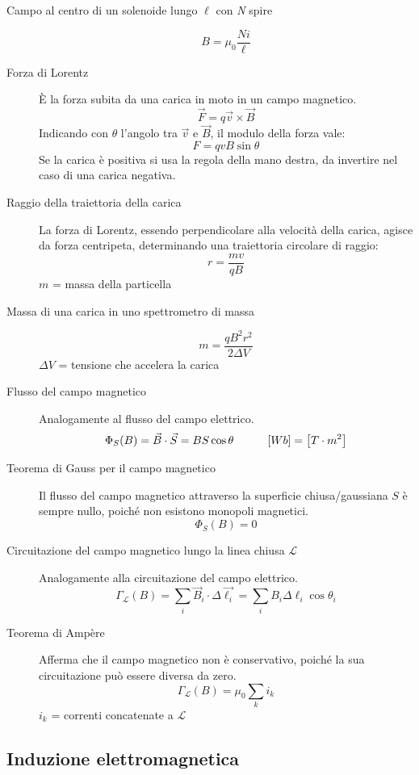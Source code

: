 \documentclass[a4paper,11pt,italian]{article}
\begin{document}
\begin{description}
  \item[Campo al centro di un solenoide lungo $ \ell $ con \textit{N} spire]
  \[ B = \mu_0 \frac{Ni}{\ell}\]
  
  \item[Forza di Lorentz] 
  È la forza subita da una carica in moto in un campo magnetico.
  \[ \vec{F} = q \vec{v} \times \vec{B} \]
  Indicando con $ \theta $ l'angolo tra $ \vec{v} $ e $ \vec{B} $, il modulo della forza vale:
  \[ F = qvB\sin \theta \]
  Se la carica è positiva si usa la regola della mano destra, da invertire nel caso di una carica negativa.
  
  \item[Raggio della traiettoria della carica] 
  La forza di Lorentz, essendo perpendicolare alla velocità della carica, agisce da forza centripeta, determinando una traiettoria circolare di raggio:
  \[ r = \frac{mv}{qB} \]
  $ m $ = massa della particella

  \item[Massa di una carica in uno spettrometro di massa]
  \[ m = \frac{qB^2r^2}{2 \Delta V} \]
  $  \Delta V $ = tensione che accelera la carica
  
  \item[Flusso del campo magnetico] 
  Analogamente al flusso del campo elettrico.
  \[ \Phi_S(B) = \vec{B} \cdot \vec{S} = B S \cos \theta \hspace*{3em} [Wb] = \left[ T \cdot m^2 \right] \]
  
  \item[Teorema di Gauss per il campo magnetico] 
  Il flusso del campo magnetico attraverso la superficie chiusa/gaussiana $ S $ è sempre nullo, poiché non esistono monopoli magnetici.
  \[ \Phi_S(B) = 0 \]
  
  \item[Circuitazione del campo magnetico lungo la linea chiusa $ \mathscr{L} $]\label{conc:circuitazioneB}
  Analogamente alla circuitazione del campo elettrico.
  \[ \Gamma_\mathscr{L}(B) = \sum_i \vec{B}_i \cdot \Delta\vec{\ell_i} = \sum_i B_i \Delta \ell_i \cos \theta_i \]
  
  \item[Teorema di Ampère] 
  Afferma che il campo magnetico non è conservativo, poiché la sua circuitazione può essere diversa da zero.
  \[ \Gamma_\mathscr{L}(B) = \mu_0 \sum_k i_k \]
  $ i_k $ = correnti concatenate a $ \mathscr{L} $
\end{description}

\subsection{Induzione elettromagnetica}
\end{document}
